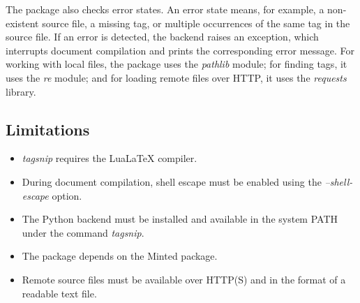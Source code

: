 \documentclass{article}
\begin{document}
The package also checks error states. An error state means, for example, a non-existent source file, 
a missing tag, or multiple occurrences of the same tag in the source file. If an error is detected, 
the backend raises an exception, which interrupts document compilation and prints the corresponding error message. 
For working with local files, the package uses the \textit{pathlib} module; for finding tags, it uses the \textit{re} module; 
and for loading remote files over HTTP, it uses the \textit{requests} library.

\subsection*{Limitations}

\begin{itemize}
    \item \textit{tagsnip} requires the LuaLa\TeX{} compiler.
    
    \item During document compilation, 
    shell escape must be enabled using the \textit{--shell-escape} option.

    \item The Python backend must be installed and available in the system PATH 
    under the command \textit{tagsnip}.

    \item The package depends on the Minted package.

    \item Remote source files must be available over HTTP(S) and in the format of 
    a readable text file.
\end{itemize}



\end{document}
